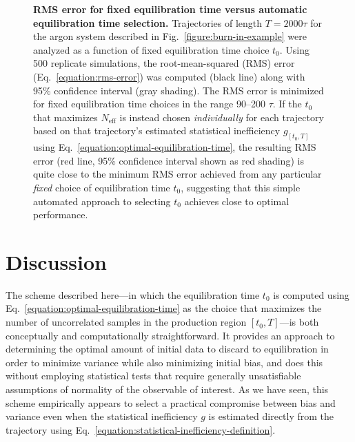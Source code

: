 \documentclass[aps,pre,twocolumn,nofootinbib,superscriptaddress,linenumbers,11point]{revtex4-1}
\begin{document}
\begin{figure}[tbp]
\caption{\label{figure:argon-rmse} {\bf RMS error for fixed equilibration time versus automatic equilibration time selection.} 
Trajectories of length $T = 2000 \tau$ for the argon system described in Fig.~\ref{figure:burn-in-example} were analyzed as a function of fixed equilibration time choice $t_0$.
Using 500 replicate simulations, the root-mean-squared (RMS) error (Eq.~\ref{equation:rms-error}) was computed (black line) along with 95\% confidence interval (gray shading).
The RMS error is minimized for fixed equilibration time choices in the range 90--200 $\tau$.
If the $t_0$ that maximizes $N_\mathrm{eff}$ is instead chosen \emph{individually} for each trajectory based on that trajectory's estimated statistical inefficiency $g_{[t_0,T]}$ using Eq.~\ref{equation:optimal-equilibration-time}, the resulting RMS error (red line, 95\% confidence interval shown as red shading) is quite close to the minimum RMS error achieved from any particular \emph{fixed} choice of equilibration time $t_0$, suggesting that this simple automated approach to selecting $t_0$ achieves close to optimal performance.
}
\end{figure}


\section*{Discussion}
\label{section:discussion}

The scheme described here---in which the equilibration time $t_0$ is computed using Eq.~\ref{equation:optimal-equilibration-time} as the choice that maximizes the number of uncorrelated samples in the production region $[t_0,T]$---is both conceptually and computationally straightforward.
It provides an approach to determining the optimal amount of initial data to discard to equilibration in order to minimize variance while also minimizing initial bias, and does this without employing statistical tests that require generally unsatisfiable assumptions of normality of the observable of interest.
As we have seen, this scheme empirically appears to select a practical compromise between bias and variance even when the statistical inefficiency $g$ is estimated directly from the trajectory using Eq.~\ref{equation:statistical-inefficiency-definition}.
\end{document}
